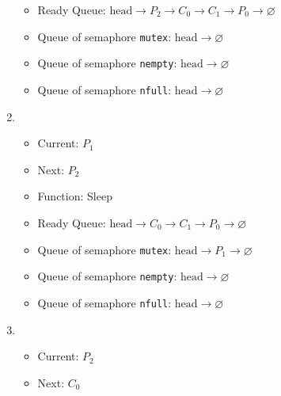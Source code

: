 \documentclass[11pt]{article}
\begin{document}
\begin{question}
\begin{enumerate}
{\begin{itemize}
                    \item{
                        Ready Queue: $\text{head}\longrightarrow
                        P_{2}\longrightarrow
                        C_{0}\longrightarrow
                        C_{1}\longrightarrow
                        P_{0}\longrightarrow\varnothing$
                    } \item{
                        Queue of semaphore {\tt mutex}: $\text{head}\longrightarrow\varnothing$
                    }
                    \item{
                        Queue of semaphore {\tt nempty}: $\text{head}\longrightarrow\varnothing$
                    }
                    \item{
                        Queue of semaphore {\tt nfull}: $\text{head}\longrightarrow\varnothing$
                    }
                \end{itemize}
            }
            \item {
                \begin{itemize}
                    \item{Current: $P_{1}$}
                    \item{Next: $P_{2}$}
                    \item{Function: Sleep}
                    \item{
                        Ready Queue: $\text{head}\longrightarrow
                        C_{0}\longrightarrow
                        C_{1}\longrightarrow
                        P_{0}\longrightarrow\varnothing$
                    } \item{
                        Queue of semaphore {\tt mutex}: $\text{head}\longrightarrow
                        P_{1}\longrightarrow
                        \varnothing$
                    }
                    \item{
                        Queue of semaphore {\tt nempty}: $\text{head}\longrightarrow\varnothing$
                    }
                    \item{
                        Queue of semaphore {\tt nfull}: $\text{head}\longrightarrow\varnothing$
                    }
                \end{itemize}
            }
            \item {
                \begin{itemize}
                    \item{Current: $P_{2}$}
                    \item{Next: $C_{0}$}

\end{itemize}}
\end{enumerate}
\end{question}
\end{document}
